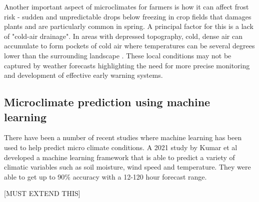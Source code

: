 Another important aspect of microclimates for farmers is how it can affect frost
risk - sudden and unpredictable drops below freezing in crop fields that damages
plants and are particularly common in spring. A principal factor for this is a
lack of "cold-air drainage". In areas with depressed topography, cold, dense air
can accumulate to form pockets of cold air where temperatures can be several
degrees lower than the surrounding landscape \cite{drepper2022}. These local
conditions may not be captured by weather forecasts highlighting the need for
more precise monitoring and development of effective early warning systems.

\subsection{Microclimate prediction using machine learning}

There have been a number of recent studies where machine learning has been used
to help predict micro climate conditions. A 2021 study by Kumar et al developed
a machine learning framework that is able to predict a variety of climatic
variables such as soil moisture, wind speed and temperature. They were able to
get up to 90\% accuracy with a 12-120 hour forecast range.

[MUST EXTEND THIS]



